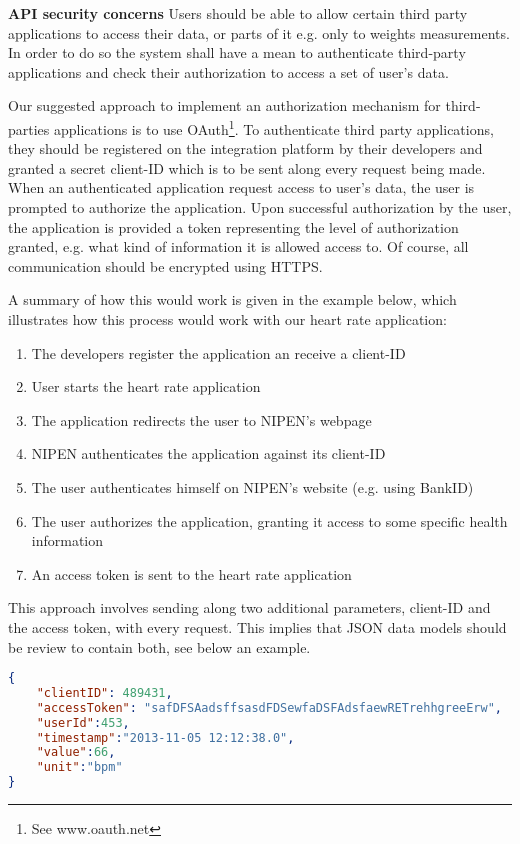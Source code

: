 \textbf{API security concerns}\newline
Users should be able to allow certain third party applications to access
their data, or parts of it e.g. only to weights measurements.
In order to do so the system shall have a mean to authenticate third-party applications
and check their authorization to access a set of user's data.

Our suggested approach to implement an authorization mechanism for third-parties
applications is to use OAuth\footnote{See www.oauth.net}.
To authenticate third party applications, they should be registered on the integration
platform by their developers and granted a secret client-ID which is to be sent along every
request being made.
When an authenticated application request access to user's data, the user
is prompted to authorize the application.
Upon successful authorization by the user, the application is provided
a token representing the level of authorization granted, e.g. what kind of information
it is allowed access to. Of course, all communication should be encrypted using HTTPS.

A summary of how this would work is given in the example below, which illustrates how this
process would work with our heart rate application:

\begin{enumerate}[1.]
\item The developers register the application an receive a client-ID
\item User starts the heart rate application
\item The application redirects the user to NIPEN's webpage
\item NIPEN authenticates the application against its client-ID
\item The user authenticates himself on NIPEN's website (e.g. using BankID)
\item The user authorizes the application, granting it access to some specific health information
\item An access token is sent to the heart rate application
\end{enumerate}

This approach involves sending along two additional parameters, client-ID and the access token,
with every request. This implies that JSON data models should be review to contain both,
see below an example.

\begin{lstlisting}[language=json]
{
	"clientID": 489431,
	"accessToken": "safDFSAadsffsasdFDSewfaDSFAdsfaewRETrehhgreeErw",
	"userId":453,
	"timestamp":"2013-11-05 12:12:38.0",
	"value":66,
	"unit":"bpm"
}
\end{lstlisting}



